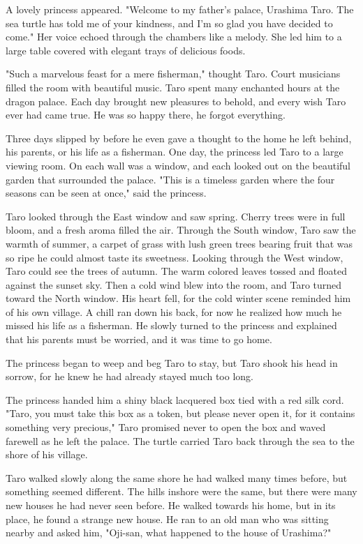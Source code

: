 A lovely princess appeared. "Welcome to my father's palace, Urashima Taro. The sea turtle has told me of your kindness, and I'm so glad you have decided to come." Her voice echoed through the chambers like a melody. She led him to a large table covered with elegant trays of delicious foods.

"Such a marvelous feast for a mere fisherman," thought Taro. Court musicians filled the room with beautiful music. Taro spent many enchanted hours at the dragon palace. Each day brought new pleasures to behold, and every wish Taro ever had came true. He was so happy there, he forgot everything.

Three days slipped by before he even gave a thought to the home he left behind, his parents, or his life as a fisherman. One day, the princess led Taro to a large viewing room. On each wall was a window, and each looked out on the beautiful garden that surrounded the palace. "This is a timeless garden where the four seasons can be seen at once," said the princess.

Taro looked through the East window and saw spring. Cherry trees were in full bloom, and a fresh aroma filled the air. Through the South window, Taro saw the warmth of summer, a carpet of grass with lush green trees bearing fruit that was so ripe he could almost taste its sweetness. Looking through the West window, Taro could see the trees of autumn. The warm colored leaves tossed and floated against the sunset sky. Then a cold wind blew into the room, and Taro turned toward the North window. His heart fell, for the cold winter scene reminded him of his own village. A chill ran down his back, for now he realized how much he missed his life as a fisherman. He slowly turned to the princess and explained that his parents must be worried, and it was time to go home.

The princess began to weep and beg Taro to stay, but Taro shook his head in sorrow, for he knew he had already stayed much too long.

The princess handed him a shiny black lacquered box tied with a red silk cord. "Taro, you must take this box as a token, but please never open it, for it contains something very precious," Taro promised never to open the box and waved farewell as he left the palace. The turtle carried Taro back through the sea to the shore of his village.

Taro walked slowly along the same shore he had walked many times before, but something seemed different. The hills inshore were the same, but there were many new houses he had never seen before. He walked towards his home, but in its place, he found a strange new house. He ran to an old man who was sitting nearby and asked him, "Oji-san, what happened to the house of Urashima?"

